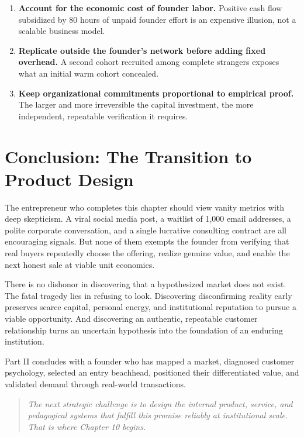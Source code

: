 \begin{enumerate}
    \item \textbf{Account for the economic cost of founder labor.} Positive cash flow subsidized by 80 hours of unpaid founder effort is an expensive illusion, not a scalable business model.
    \item \textbf{Replicate outside the founder's network before adding fixed overhead.} A second cohort recruited among complete strangers exposes what an initial warm cohort concealed.
    \item \textbf{Keep organizational commitments proportional to empirical proof.} The larger and more irreversible the capital investment, the more independent, repeatable verification it requires.
\end{enumerate}

\section*{Conclusion: The Transition to Product Design}

The entrepreneur who completes this chapter should view vanity metrics with deep skepticism. A viral social media post, a waitlist of 1,000 email addresses, a polite corporate conversation, and a single lucrative consulting contract are all encouraging signals. But none of them exempts the founder from verifying that real buyers repeatedly choose the offering, realize genuine value, and enable the next honest sale at viable unit economics.

There is no dishonor in discovering that a hypothesized market does not exist. The fatal tragedy lies in refusing to look. Discovering disconfirming reality early preserves scarce capital, personal energy, and institutional reputation to pursue a viable opportunity. And discovering an authentic, repeatable customer relationship turns an uncertain hypothesis into the foundation of an enduring institution.

Part II concludes with a founder who has mapped a market, diagnosed customer psychology, selected an entry beachhead, positioned their differentiated value, and validated demand through real-world transactions.

\begin{quote}
\emph{The next strategic challenge is to design the internal product, service, and pedagogical systems that fulfill this promise reliably at institutional scale. That is where Chapter 10 begins.}
\end{quote}
